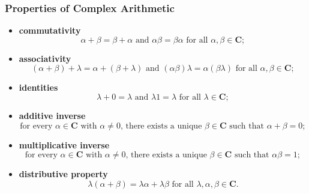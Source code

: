 \documentclass{article}
\begin{document}
	\subsubsection{Properties of Complex Arithmetic}
	\begin{itemize}
		\item \textbf{commutativity}
		\begin{equation*}
			\alpha + \beta = \beta + \alpha \text{ and } \alpha\beta = \beta\alpha \text{ for all } \alpha,\beta\in\mathbf{C};
		\end{equation*}

		\item \textbf{associativity}
		\begin{equation*}
			(\alpha + \beta) + \lambda = \alpha + (\beta + \lambda) \text{ and } (\alpha\beta)\lambda = \alpha(\beta\lambda) \text{ for all } \alpha,\beta\in\mathbf{C};
		\end{equation*}

		\item \textbf{identities}
		\begin{equation*}
			\lambda + 0 = \lambda \text{ and } \lambda 1 = \lambda \text{ for all } \lambda \in \mathbf{C}; 
		\end{equation*}

		\item \textbf{additive inverse}
		\begin{equation*}
			\text{for every } \alpha\in\mathbf{C} \text{ with } \alpha\neq 0 \text{, there exists a unique } \beta\in\mathbf{C} \text{ such that } \alpha + \beta = 0;
		\end{equation*}

		\item \textbf{multiplicative inverse}
		\begin{equation*}
			\text{for every } \alpha\in\mathbf{C} \text{ with } \alpha\neq 0 \text{, there exists a unique } \beta\in\mathbf{C} \text{ such that } \alpha\beta = 1;
		\end{equation*}

		\item \textbf{distributive property}
		\begin{equation*}
			\lambda(\alpha + \beta) = \lambda\alpha + \lambda\beta \text{ for all } \lambda,\alpha,\beta\in\mathbf{C}.
		\end{equation*}
	\end{itemize}
\end{document}
